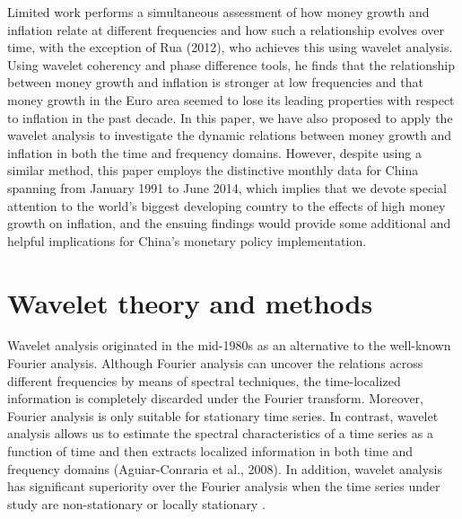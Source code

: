 \documentclass[a4paper,fleqn]{cas-sc}
\begin{document}
Limited work performs a simultaneous assessment of how money growth and inflation relate at different frequencies and how such a relationship evolves over time, with the exception of Rua (2012), who achieves this using wavelet analysis. Using wavelet coherency and phase difference tools, he finds that the relationship between money growth and inflation is stronger at low frequencies and that money growth in the Euro area seemed to lose its leading properties with respect to inflation in the past decade. In this paper, we have also proposed to apply the wavelet analysis to investigate the dynamic relations between money growth and inflation in both the time and frequency domains. However, despite using a similar method, this paper employs the distinctive monthly data for China spanning from January 1991 to June 2014, which implies that we devote special attention to the world's biggest developing country to the effects of high money growth on inflation, and the ensuing findings would provide some additional and helpful implications for China's monetary policy implementation.

\section{Wavelet theory and methods}\label{sec:3}
Wavelet analysis originated in the mid-1980s as an alternative to the well-known Fourier analysis. Although Fourier analysis can uncover the relations across different frequencies by means of spectral techniques, the time-localized information is completely discarded under the Fourier transform. Moreover, Fourier analysis is only suitable for stationary time series. In contrast, wavelet analysis allows us to estimate the spectral characteristics of a time series as a function of time and then extracts localized information in both time and frequency domains (Aguiar-Conraria et al., 2008). In addition, wavelet analysis has significant superiority over the Fourier analysis when the time series under study are non-stationary or locally stationary \cite{ROUEFF2011813}.
\end{document}
